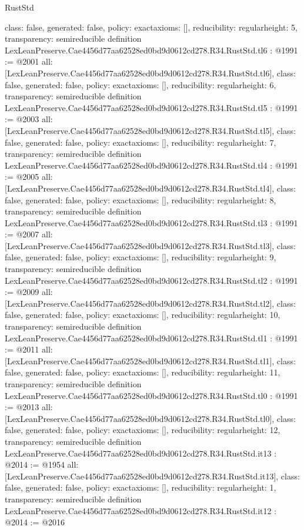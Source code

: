 \begin{lexlean}{RustStd}
\begin{coremodule}
{  class: false,
  generated: false,
  policy: exact{axioms: []},
  reducibility: regular{height: 5},
  transparency: semireducible
}
definition LexLeanPreserve.Cae4456d77aa62528ed0bd9d0612cd278.R34.RustStd.tl6 : @1991 := @2001 {
  all: [LexLeanPreserve.Cae4456d77aa62528ed0bd9d0612cd278.R34.RustStd.tl6],
  class: false,
  generated: false,
  policy: exact{axioms: []},
  reducibility: regular{height: 6},
  transparency: semireducible
}
definition LexLeanPreserve.Cae4456d77aa62528ed0bd9d0612cd278.R34.RustStd.tl5 : @1991 := @2003 {
  all: [LexLeanPreserve.Cae4456d77aa62528ed0bd9d0612cd278.R34.RustStd.tl5],
  class: false,
  generated: false,
  policy: exact{axioms: []},
  reducibility: regular{height: 7},
  transparency: semireducible
}
definition LexLeanPreserve.Cae4456d77aa62528ed0bd9d0612cd278.R34.RustStd.tl4 : @1991 := @2005 {
  all: [LexLeanPreserve.Cae4456d77aa62528ed0bd9d0612cd278.R34.RustStd.tl4],
  class: false,
  generated: false,
  policy: exact{axioms: []},
  reducibility: regular{height: 8},
  transparency: semireducible
}
definition LexLeanPreserve.Cae4456d77aa62528ed0bd9d0612cd278.R34.RustStd.tl3 : @1991 := @2007 {
  all: [LexLeanPreserve.Cae4456d77aa62528ed0bd9d0612cd278.R34.RustStd.tl3],
  class: false,
  generated: false,
  policy: exact{axioms: []},
  reducibility: regular{height: 9},
  transparency: semireducible
}
definition LexLeanPreserve.Cae4456d77aa62528ed0bd9d0612cd278.R34.RustStd.tl2 : @1991 := @2009 {
  all: [LexLeanPreserve.Cae4456d77aa62528ed0bd9d0612cd278.R34.RustStd.tl2],
  class: false,
  generated: false,
  policy: exact{axioms: []},
  reducibility: regular{height: 10},
  transparency: semireducible
}
definition LexLeanPreserve.Cae4456d77aa62528ed0bd9d0612cd278.R34.RustStd.tl1 : @1991 := @2011 {
  all: [LexLeanPreserve.Cae4456d77aa62528ed0bd9d0612cd278.R34.RustStd.tl1],
  class: false,
  generated: false,
  policy: exact{axioms: []},
  reducibility: regular{height: 11},
  transparency: semireducible
}
definition LexLeanPreserve.Cae4456d77aa62528ed0bd9d0612cd278.R34.RustStd.tl0 : @1991 := @2013 {
  all: [LexLeanPreserve.Cae4456d77aa62528ed0bd9d0612cd278.R34.RustStd.tl0],
  class: false,
  generated: false,
  policy: exact{axioms: []},
  reducibility: regular{height: 12},
  transparency: semireducible
}
definition LexLeanPreserve.Cae4456d77aa62528ed0bd9d0612cd278.R34.RustStd.it13 : @2014 := @1954 {
  all: [LexLeanPreserve.Cae4456d77aa62528ed0bd9d0612cd278.R34.RustStd.it13],
  class: false,
  generated: false,
  policy: exact{axioms: []},
  reducibility: regular{height: 1},
  transparency: semireducible
}
definition LexLeanPreserve.Cae4456d77aa62528ed0bd9d0612cd278.R34.RustStd.it12 : @2014 := @2016 {
}
\end{coremodule}
\end{lexlean}
